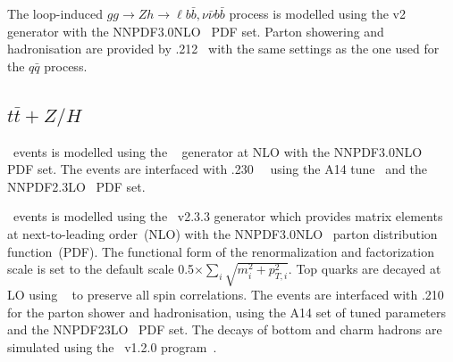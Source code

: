\par The loop-induced $gg\to Zh \to \ell b\bar{b}, \nu\bar{\nu}b\bar{b}$ process is modelled using the \powhegbox v2 generator \cite{Alioli:2010xd} with the NNPDF3.0NLO~\cite{Ball:2014uwa} PDF set.
Parton showering and hadronisation are provided by \pythia.212~\cite{Sjostrand:2014zea} with the same settings as the one used for the $q\bar{q}$ process.

\subsection{$t\bar{t}+Z/H$}

\par \ttH\ events is modelled using the \powhegbox~\cite{Frixione:2007nw,Nason:2004rx,Frixione:2007vw,Alioli:2010xd,Hartanto:2015uka}
generator at NLO with the NNPDF3.0NLO~\cite{Ball:2014uwa} PDF set.
The events are interfaced with \pythia.230~\cite{Sjostrand:2014zea}~ using the A14 tune~\cite{ATL-PHYS-PUB-2014-021} and the NNPDF2.3LO~\cite{Ball:2014uwa} PDF set.

\par \ttV\ events is modelled using the \mgamc~v2.3.3 \cite{Alwall:2014hca}
generator which provides matrix elements at next-to-leading order~(NLO) 
with the NNPDF3.0NLO~\cite{Ball:2014uwa} parton distribution function~(PDF).
The functional form of the renormalization and factorization scale is set to the default scale 0.5$\times \sum_i \sqrt{m^2_i+p^2_{T,i}}.$
Top quarks are decayed at LO using \madspin~\cite{Frixione:2007zp,Artoisenet:2012st} to preserve all spin correlations.
The events are interfaced with \pythia.210~\cite{Sjostrand:2014zea} for the parton shower and hadronisation,
using the A14 set of tuned parameters~\cite{ATL-PHYS-PUB-2014-021}  and the NNPDF23LO~\cite{Ball:2014uwa} PDF set.
The decays of bottom and charm hadrons are simulated using the \evtgen\ v1.2.0 program~\cite{EvtGen}.
